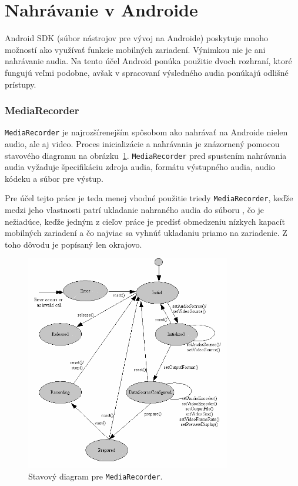 \section{Nahrávanie v Androide}
\label{recording_android}

Android SDK (súbor nástrojov pre vývoj na Androide) poskytuje mnoho možností ako využívať funkcie mobilných zariadení. Výnimkou nie je ani nahrávanie audia. Na tento účel Android ponúka použitie dvoch rozhraní, ktoré fungujú veľmi podobne, avšak v spracovaní výsledného audia ponúkajú odlišné prístupy. 

\subsubsection{MediaRecorder}

\texttt{MediaRecorder} je najrozšírenejším spôsobom ako nahrávať na Androide nielen audio, ale aj video. Proces inicializácie a nahrávania je znázornený pomocou stavového diagramu na obrázku~\ref{mediarecorder-states}. \texttt{MediaRecorder} pred spustením nahrávania audia vyžaduje špecifikáciu zdroja audia, formátu výstupného audia, audio kódeku a súbor pre výstup.

Pre účel tejto práce je teda menej vhodné použitie triedy \texttt{MediaRecorder}, keďže medzi jeho vlastnosti patrí ukladanie nahraného audia do súboru \cite{Mednieks}, čo je nežiadúce, keďže jedným z cieľov práce je predísť obmedzeniu nízkych kapacít mobilných zariadení a čo najviac sa vyhnúť ukladaniu priamo na zariadenie. Z toho dôvodu je popísaný len okrajovo. 

\begin{figure}[hbt]
	\centering
	\includegraphics[width=0.8\textwidth]{obrazky-figures/mediarecorder.png}
	\caption{Stavový diagram pre \texttt{MediaRecorder}\protect\footnotemark.}
	\label{mediarecorder-states}
\end{figure}

